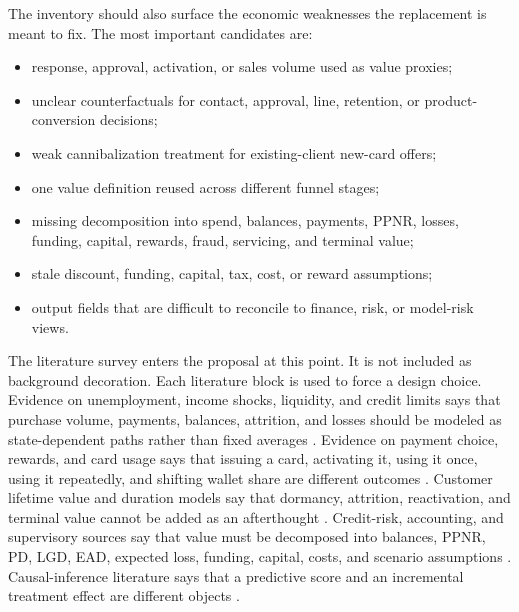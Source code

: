\documentclass[11pt]{article}
\newcommand{\1}{\mathbf{1}}
\begin{document}
The inventory should also surface the economic weaknesses the replacement is
meant to fix. The most important candidates are:
\begin{itemize}[leftmargin=*]
  \item response, approval, activation, or sales volume used as value proxies;
  \item unclear counterfactuals for contact, approval, line, retention, or
        product-conversion decisions;
  \item weak cannibalization treatment for existing-client new-card offers;
  \item one value definition reused across different funnel stages;
  \item missing decomposition into spend, balances, payments, PPNR, losses,
        funding, capital, rewards, fraud, servicing, and terminal value;
  \item stale discount, funding, capital, tax, cost, or reward assumptions;
  \item output fields that are difficult to reconcile to finance, risk, or
        model-risk views.
\end{itemize}

The literature survey enters the proposal at this point. It is not included as
background decoration. Each literature block is used to force a design choice.
Evidence on unemployment, income shocks, liquidity, and credit limits says that
purchase volume, payments, balances, attrition, and losses should be modeled as
state-dependent paths rather than fixed averages
\citep{ganong2019unemployment,johnson2004rebates,gross2001liquidity}.
Evidence on payment choice, rewards, and card usage says that issuing a card,
activating it, using it once, using it repeatedly, and shifting wallet share are
different outcomes \citep{koulayev2012payment,agarwal2010rewards,
prelec2001creditcard}. Customer lifetime value and duration models say that
dormancy, attrition, reactivation, and terminal value cannot be added as an
afterthought \citep{schmittlein1987counting,fader2005bgnbd,fader2005rfm,
bolton1998duration}. Credit-risk, accounting, and supervisory sources say that
value must be decomposed into balances, PPNR, PD, LGD, EAD, expected loss,
funding, capital, costs, and scenario assumptions
\citep{bcbs2006basel,federalreserve2025stressmethodology,
federalreserve2026stressmethodology}. Causal-inference literature says that a
predictive score and an incremental treatment effect are different objects
\citep{imbensrubin2015causal,angrist2009mostlyharmless,
hernanrobins2020causal}.
\end{document}

